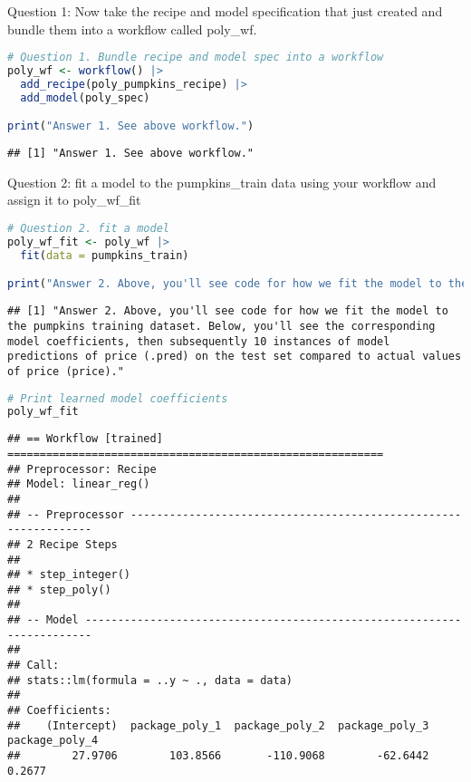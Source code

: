 \documentclass[
]{article}
\begin{document}
Question 1: Now take the recipe and model specification that just
created and bundle them into a workflow called poly\_wf.

\begin{lstlisting}[language=R]
# Question 1. Bundle recipe and model spec into a workflow
poly_wf <- workflow() |> 
  add_recipe(poly_pumpkins_recipe) |> 
  add_model(poly_spec)

print("Answer 1. See above workflow.")
\end{lstlisting}

\begin{lstlisting}
## [1] "Answer 1. See above workflow."
\end{lstlisting}

Question 2: fit a model to the pumpkins\_train data using your workflow
and assign it to poly\_wf\_fit

\begin{lstlisting}[language=R]
# Question 2. fit a model
poly_wf_fit <- poly_wf |> 
  fit(data = pumpkins_train)

print("Answer 2. Above, you'll see code for how we fit the model to the pumpkins training dataset. Below, you'll see the corresponding model coefficients, then subsequently 10 instances of model predictions of price (.pred) on the test set compared to actual values of price (price).")
\end{lstlisting}

\begin{lstlisting}
## [1] "Answer 2. Above, you'll see code for how we fit the model to the pumpkins training dataset. Below, you'll see the corresponding model coefficients, then subsequently 10 instances of model predictions of price (.pred) on the test set compared to actual values of price (price)."
\end{lstlisting}

\begin{lstlisting}[language=R]
# Print learned model coefficients
poly_wf_fit
\end{lstlisting}

\begin{lstlisting}
## == Workflow [trained] ==========================================================
## Preprocessor: Recipe
## Model: linear_reg()
## 
## -- Preprocessor ----------------------------------------------------------------
## 2 Recipe Steps
## 
## * step_integer()
## * step_poly()
## 
## -- Model -----------------------------------------------------------------------
## 
## Call:
## stats::lm(formula = ..y ~ ., data = data)
## 
## Coefficients:
##    (Intercept)  package_poly_1  package_poly_2  package_poly_3  package_poly_4  
##        27.9706        103.8566       -110.9068        -62.6442          0.2677
\end{lstlisting}
\end{document}
